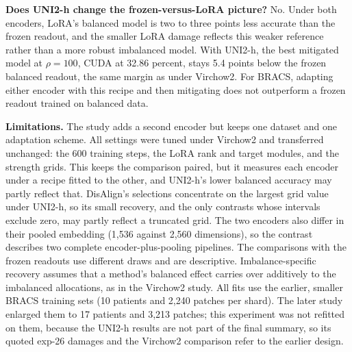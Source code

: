 \textbf{Does UNI2-h change the frozen-versus-LoRA picture?} No. Under both encoders, LoRA's balanced model is two to three points less accurate than the frozen readout, and the smaller LoRA damage reflects this weaker reference rather than a more robust imbalanced model. With UNI2-h, the best mitigated model at $\rho=100$, CUDA at 32.86 percent, stays 5.4 points below the frozen balanced readout, the same margin as under Virchow2. For BRACS, adapting either encoder with this recipe and then mitigating does not outperform a frozen readout trained on balanced data.

\textbf{Limitations.} The study adds a second encoder but keeps one dataset and one adaptation scheme. All settings were tuned under Virchow2 and transferred unchanged: the 600 training steps, the LoRA rank and target modules, and the strength grids. This keeps the comparison paired, but it measures each encoder under a recipe fitted to the other, and UNI2-h's lower balanced accuracy may partly reflect that. DisAlign's selections concentrate on the largest grid value under UNI2-h, so its small recovery, and the only contrasts whose intervals exclude zero, may partly reflect a truncated grid. The two encoders also differ in their pooled embedding (1,536 against 2,560 dimensions), so the contrast describes two complete encoder-plus-pooling pipelines. The comparisons with the frozen readouts use different draws and are descriptive. Imbalance-specific recovery assumes that a method's balanced effect carries over additively to the imbalanced allocations, as in the Virchow2 study. All fits use the earlier, smaller BRACS training sets (10 patients and 2,240 patches per shard). The later study enlarged them to 17 patients and 3,213 patches; this experiment was not refitted on them, because the UNI2-h results are not part of the final summary, so its quoted exp-26 damages and the Virchow2 comparison refer to the earlier design.
